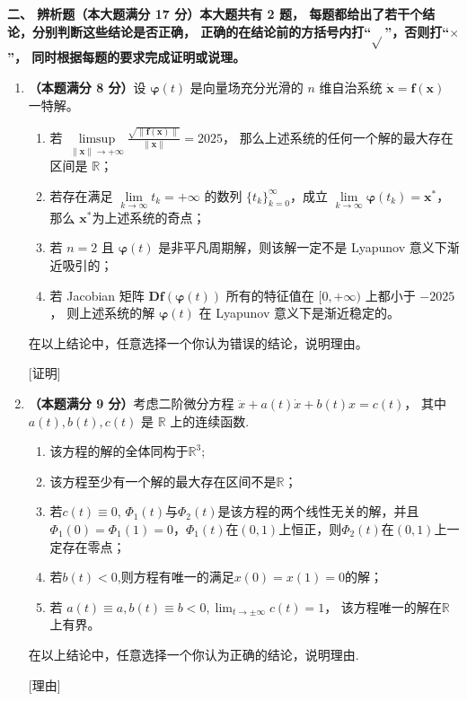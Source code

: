 \textbf{二、 辨析题（本大题满分 17 分）本大题共有 2 题，
每题都给出了若干个结论，分别判断这些结论是否正确，
正确的在结论前的方括号内打``$\sqrt{ }$''，否则打``$\times$''，
同时根据每题的要求完成证明或说理。}
\begin{enumerate}
\item \textbf{（本题满分 8 分）}设 $\boldsymbol{\varphi}(t)$ 是向量场充分光滑的 $n$ 维自治系统 $\dot{\boldsymbol{x}}=\boldsymbol{f}(\boldsymbol{x})$ 一特解。
\begin{enumerate}[label=$【\qquad】$]
\item 若 $\limsup\limits_{\|\boldsymbol{x}\| \rightarrow+\infty} \frac{\sqrt{\|\boldsymbol{f}(\boldsymbol{x})\|}}{\|\boldsymbol{x}\|}=2025$，
那么上述系统的任何一个解的最大存在区间是 $\mathbb{R}$；
\item 若存在满足 $\lim\limits_{k \rightarrow \infty} t_{k}=+\infty$ 的数列 $\{t_{k}\}_{k=0}^{\infty}$，成立 $\lim\limits_{k \rightarrow \infty} \boldsymbol{\varphi}(t_{k})=\boldsymbol{x}^{*}$，
那么 $\boldsymbol{x}^{*}$为上述系统的奇点；
\item 若 $n = 2$ 且 $\boldsymbol{\varphi}(t)$ 是非平凡周期解，则该解一定不是 Lyapunov 意义下渐近吸引的；
\item 若 Jacobian 矩阵 $\boldsymbol{D} \boldsymbol{f}(\boldsymbol{\varphi}(t))$ 所有的特征值在 $[0,+\infty)$ 上都小于 $-2025$，
则上述系统的解 $\boldsymbol{\varphi}(t)$ 在 Lyapunov 意义下是渐近稳定的。
\end{enumerate}
在以上结论中，任意选择一个你认为错误的结论，说明理由。

[证明]

\item \textbf{（本题满分 9 分）}考虑二阶微分方程 $\ddot{x}+a(t) \dot{x}+b(t)x=c(t)$，
其中 $a(t), b(t), c(t)$ 是 $\mathbb{R}$ 上的连续函数.
\begin{enumerate}[label=$【\qquad】$]
\item 该方程的解的全体同构于$\mathbb{R}^3$;
\item 该方程至少有一个解的最大存在区间不是$\mathbb{R}$；  
\item 若$c(t) \equiv 0$, $\Phi_1(t)$与$\Phi_2(t)$是该方程的两个线性无关的解，并且$\Phi_1(0)=\Phi_1(1)=0$，$\Phi_1(t)$在$(0,1)$上恒正，则$\Phi_2(t)$在$(0,1)$上一定存在零点；
\item 若$b(t)<0$,则方程有唯一的满足$x(0)=x(1)=0$的解；
\item 若 $a(t) \equiv a, b(t) \equiv b < 0 ,\lim_{t \rightarrow \pm \infty}c(t)=1$，
该方程唯一的解在$\mathbb{R}$上有界。
\end{enumerate}
在以上结论中，任意选择一个你认为正确的结论，说明理由.

[理由]
\end{enumerate}

